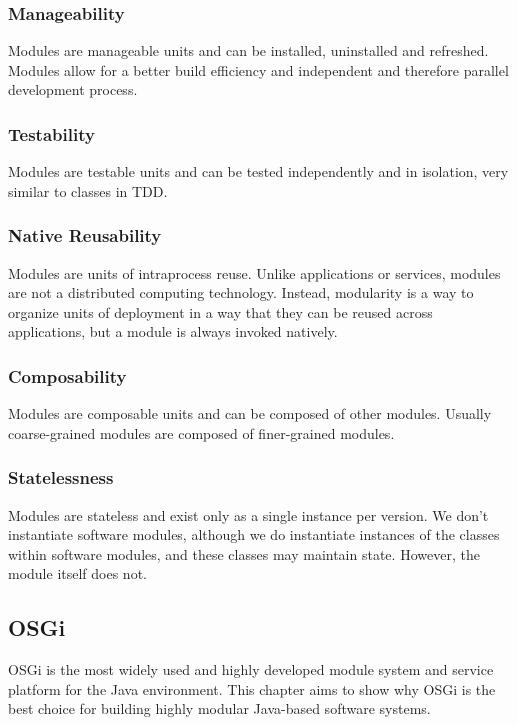 \subsubsection{Manageability}
Modules are manageable units and can be installed, uninstalled and refreshed. Modules allow for a better build efficiency and independent and therefore parallel development process.

\subsubsection{Testability}
Modules are testable units and can be tested independently and in isolation, very similar to classes in \gls{TDD}.

\subsubsection{Native Reusability}
Modules are units of intraprocess reuse. Unlike applications or services, modules are not a distributed computing technology. Instead, modularity is a way to organize units of deployment in a way that they can be reused across applications, but a module is always invoked natively.

\subsubsection{Composability}
Modules are composable units and can be composed of other modules. Usually coarse-grained modules are composed of finer-grained modules.

\subsubsection{Statelessness}
Modules are stateless and exist only as a single instance per version. We don’t instantiate software modules, although we do instantiate instances of the classes within software modules, and these classes may maintain state. However, the module itself does not.

\subsection{OSGi}
\gls{OSGi} is the most widely used and highly developed module system and service platform for the Java environment. This chapter aims to show why \gls{OSGi} is the best choice for building highly modular Java-based software systems.

